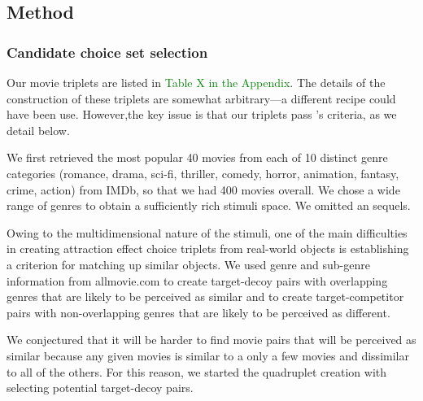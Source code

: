 \documentclass[12pt, a4paper]{article}
\newcommand{\NS}[1] {{\textcolor{green}{#1}}}
\begin{document}
\subsection{Method}

\subsubsection{Candidate choice set selection}

Our movie triplets are listed in \NS{Table X in the Appendix}. The details of the construction of these triplets are somewhat arbitrary---a different recipe could have been use. However,the key issue is that our triplets pass \citeauthor{Huber2014}'s \citeyear{Huber2014} criteria, as we detail below.

We first retrieved the most popular 40 movies from each of 10 distinct genre categories (romance, drama, sci-fi, thriller, comedy, horror, animation, fantasy, crime, action) from IMDb, so that we had 400 movies overall. We chose a wide range of genres to obtain a sufficiently rich stimuli space. We omitted an sequels. 

Owing to the multidimensional nature of the stimuli, one of the main difficulties in creating attraction effect choice triplets from real-world objects is establishing a criterion for matching up similar objects. We used genre and sub-genre information from allmovie.com to create target-decoy pairs with overlapping genres that are likely to be perceived as similar and to create target-competitor pairs with non-overlapping genres that are likely to be perceived as different. 

We conjectured that it will be harder to find movie pairs that will be perceived as similar because any given movies is similar to a only a few movies and dissimilar to all of the others. For this reason, we started the quadruplet creation with selecting potential target-decoy pairs.
\end{document}
